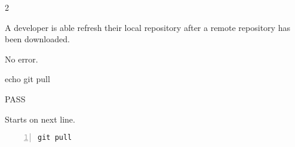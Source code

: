 \begin{description}[align=right,leftmargin=3.2cm,labelindent=3.0cm]
\item[Step:] 2
\item[Confirm:] A developer is able refresh their local repository after a remote repository has been downloaded.
\item[Expectation:] No error.
\item[Command:] echo git  pull
\item[Test Result:] PASS
\item[Evidence:] Starts on next line.
\end{description}
\begin{lstlisting}[numbers=left]
git pull

\end{lstlisting}
